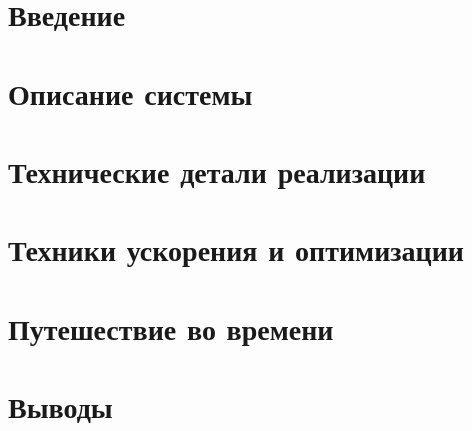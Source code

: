 


\sloppy




\clearpage      %
\tableofcontents
\clearpage  

\section{Введение}


\section{Описание системы}


\section{Технические детали реализации}


\section{Техники ускорения и оптимизации}


\section{Путешествие во времени}


\section{Выводы}



{}

